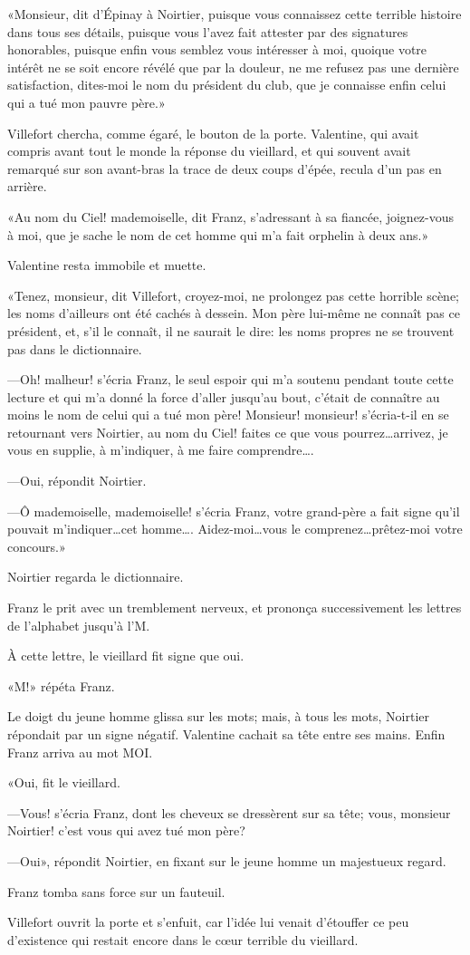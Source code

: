 «Monsieur, dit d'Épinay à Noirtier, puisque vous connaissez cette terrible histoire dans tous ses détails, puisque vous l'avez fait attester par des signatures honorables, puisque enfin vous semblez vous intéresser à moi, quoique votre intérêt ne se soit encore révélé que par la douleur, ne me refusez pas une dernière satisfaction, dites-moi le nom du président du club, que je connaisse enfin celui qui a tué mon pauvre père.» 

Villefort chercha, comme égaré, le bouton de la porte. Valentine, qui avait compris avant tout le monde la réponse du vieillard, et qui souvent avait remarqué sur son avant-bras la trace de deux coups d'épée, recula d'un pas en arrière. 

«Au nom du Ciel! mademoiselle, dit Franz, s'adressant à sa fiancée, joignez-vous à moi, que je sache le nom de cet homme qui m'a fait orphelin à deux ans.» 

Valentine resta immobile et muette. 

«Tenez, monsieur, dit Villefort, croyez-moi, ne prolongez pas cette horrible scène; les noms d'ailleurs ont été cachés à dessein. Mon père lui-même ne connaît pas ce président, et, s'il le connaît, il ne saurait le dire: les noms propres ne se trouvent pas dans le dictionnaire. 

—Oh! malheur! s'écria Franz, le seul espoir qui m'a soutenu pendant toute cette lecture et qui m'a donné la force d'aller jusqu'au bout, c'était de connaître au moins le nom de celui qui a tué mon père! Monsieur! monsieur! s'écria-t-il en se retournant vers Noirtier, au nom du Ciel! faites ce que vous pourrez\dots arrivez, je vous en supplie, à m'indiquer, à me faire comprendre\dots. 

—Oui, répondit Noirtier. 

—Ô mademoiselle, mademoiselle! s'écria Franz, votre grand-père a fait signe qu'il pouvait m'indiquer\dots cet homme\dots. Aidez-moi\dots vous le comprenez\dots prêtez-moi votre concours.» 

Noirtier regarda le dictionnaire. 

Franz le prit avec un tremblement nerveux, et prononça successivement les lettres de l'alphabet jusqu'à l'M. 

À cette lettre, le vieillard fit signe que oui. 

«M!» répéta Franz. 

Le doigt du jeune homme glissa sur les mots; mais, à tous les mots, Noirtier répondait par un signe négatif. Valentine cachait sa tête entre ses mains. Enfin Franz arriva au mot MOI. 

«Oui, fit le vieillard. 

—Vous! s'écria Franz, dont les cheveux se dressèrent sur sa tête; vous, monsieur Noirtier! c'est vous qui avez tué mon père? 

—Oui», répondit Noirtier, en fixant sur le jeune homme un majestueux regard. 

Franz tomba sans force sur un fauteuil. 

Villefort ouvrit la porte et s'enfuit, car l'idée lui venait d'étouffer ce peu d'existence qui restait encore dans le cœur terrible du vieillard. 